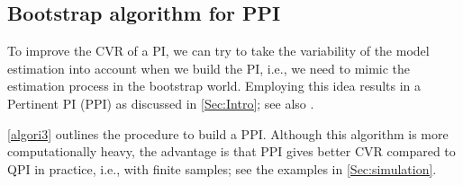 \documentclass[a4paper]{article}
\begin{document}
 

\FloatBarrier
\subsection{Bootstrap algorithm for PPI}
To improve the CVR of a PI, we can try to take the variability of the model estimation into account when we build the PI, i.e., we need to mimic the estimation process in the bootstrap world. Employing this idea results in a Pertinent PI (PPI) as discussed in \cref{Sec:Intro}; see also \cite{wang2021model}. 

\cref{algori3} outlines the procedure to build a PPI. Although this algorithm is more computationally heavy, the advantage is that PPI gives better CVR compared to QPI in practice, i.e., with finite samples; see the examples in \cref{Sec:simulation}.  
\end{document}
